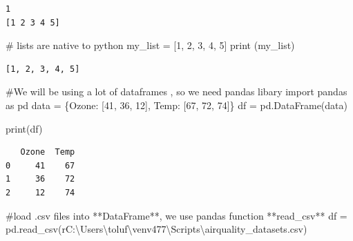\documentclass[
  letterpaper,
  DIV=11,
  numbers=noendperiod]{scrreprt}
\newenvironment{Shaded}{\begin{snugshade}}{\end{snugshade}}
\newcommand{\BuiltInTok}[1]{\textcolor[rgb]{0.00,0.23,0.31}{#1}}
\newcommand{\CommentTok}[1]{\textcolor[rgb]{0.37,0.37,0.37}{#1}}
\newcommand{\DecValTok}[1]{\textcolor[rgb]{0.68,0.00,0.00}{#1}}
\newcommand{\ImportTok}[1]{\textcolor[rgb]{0.00,0.46,0.62}{#1}}
\newcommand{\NormalTok}[1]{\textcolor[rgb]{0.00,0.23,0.31}{#1}}
\newcommand{\OperatorTok}[1]{\textcolor[rgb]{0.37,0.37,0.37}{#1}}
\newcommand{\StringTok}[1]{\textcolor[rgb]{0.13,0.47,0.30}{#1}}
\newcommand{\VerbatimStringTok}[1]{\textcolor[rgb]{0.13,0.47,0.30}{#1}}
\begin{document}
\begin{verbatim}
1
[1 2 3 4 5]
\end{verbatim}

\begin{Shaded}
\begin{Highlighting}[]
\CommentTok{\# lists are native to python }
\NormalTok{my\_list }\OperatorTok{=}\NormalTok{ [}\DecValTok{1}\NormalTok{, }\DecValTok{2}\NormalTok{, }\DecValTok{3}\NormalTok{, }\DecValTok{4}\NormalTok{, }\DecValTok{5}\NormalTok{]}
\BuiltInTok{print}\NormalTok{ (my\_list)}
\end{Highlighting}
\end{Shaded}

\begin{verbatim}
[1, 2, 3, 4, 5]
\end{verbatim}

\begin{Shaded}
\begin{Highlighting}[]
\CommentTok{\#We will be using a lot of dataframes , so we need pandas libary }
\ImportTok{import}\NormalTok{ pandas }\ImportTok{as}\NormalTok{ pd}
\NormalTok{data }\OperatorTok{=}\NormalTok{ \{}\StringTok{\textquotesingle{}Ozone\textquotesingle{}}\NormalTok{: [}\DecValTok{41}\NormalTok{, }\DecValTok{36}\NormalTok{, }\DecValTok{12}\NormalTok{], }\StringTok{\textquotesingle{}Temp\textquotesingle{}}\NormalTok{: [}\DecValTok{67}\NormalTok{, }\DecValTok{72}\NormalTok{, }\DecValTok{74}\NormalTok{]\}}
\NormalTok{df }\OperatorTok{=}\NormalTok{ pd.DataFrame(data)}
\end{Highlighting}
\end{Shaded}

\begin{Shaded}
\begin{Highlighting}[]
\BuiltInTok{print}\NormalTok{(df)}
\end{Highlighting}
\end{Shaded}

\begin{verbatim}
   Ozone  Temp
0     41    67
1     36    72
2     12    74
\end{verbatim}

\begin{Shaded}
\begin{Highlighting}[]
\CommentTok{\#load .csv files into **DataFrame**, we use pandas function **read\_csv**}
\NormalTok{df }\OperatorTok{=}\NormalTok{ pd.read\_csv(}\VerbatimStringTok{r\textquotesingle{}C:\textbackslash{}Users\textbackslash{}toluf\textbackslash{}venv477\textbackslash{}Scripts\textbackslash{}airquality\_datasets.csv\textquotesingle{}}\NormalTok{)}
\end{Highlighting}
\end{Shaded}
\end{document}
